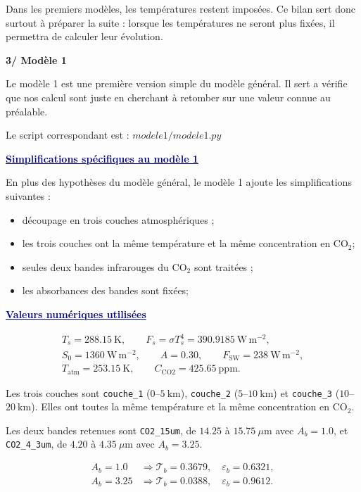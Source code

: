 \documentclass[11pt,a4paper]{article}
\newcommand{\code}[1]{\texttt{#1}}
\newcommand{\COtwo}{CO$_2$}
\newcommand{\fluxunit}{\mathrm{W\,m^{-2}}}
\newcommand{\bloc}[1]{\vspace{0.9em}\noindent\textcolor{DarkBlue}{\underline{\textbf{#1}}}\par\vspace{0.35em}}
\newcommand{\partietitre}[1]{%
    \vspace{1.1em}
    {\Large\bfseries\textcolor{DocRed}{#1}}\par
    \vspace{0.35em}
}
\begin{document}
Dans les premiers modèles, les températures restent imposées. Ce bilan sert donc surtout à préparer la suite : lorsque les températures ne seront plus fixées, il permettra de calculer leur évolution.

\partietitre{3/ Modèle 1}

Le modèle 1 est une première version simple du modèle général. Il sert a vérifie que nos calcul sont juste en cherchant à retomber sur une valeur connue au préalable.

Le script correspondant est : $modele1/modele1.py$

\bloc{Simplifications spécifiques au modèle 1}

En plus des hypothèses du modèle général, le modèle 1 ajoute les simplifications suivantes :

\begin{itemize}
    \item découpage en  trois couches atmosphériques ;
    \item les trois couches ont la même température et la même concentration en \COtwo{};
    \item seules deux bandes infrarouges du \COtwo{} sont traitées ;
    \item les absorbances des bandes sont fixées;
\end{itemize}

\bloc{Valeurs numériques utilisées}


\[
\begin{gathered}
T_s = 288.15\ \mathrm{K},
\qquad
F_s = \sigma T_s^4 = 390.9185\ \fluxunit,\\
S_0 = 1360\ \fluxunit,
\qquad
A = 0.30,
\qquad
F_{\mathrm{SW}} = 238\ \fluxunit,\\
T_{\mathrm{atm}} = 253.15\ \mathrm{K},
\qquad
C_{\mathrm{CO2}} = 425.65\ \mathrm{ppm}.
\end{gathered}
\]

Les trois couches sont \code{couche\_1} ($0$--$5\ \mathrm{km}$), \code{couche\_2} ($5$--$10\ \mathrm{km}$) et \code{couche\_3} ($10$--$20\ \mathrm{km}$). Elles ont toutes la même température et la même concentration en \COtwo.

Les deux bandes retenues sont \code{CO2\_15um}, de $14.25$ à $15.75\ \mu\mathrm{m}$ avec $A_b=1.0$, et \code{CO2\_4\_3um}, de $4.20$ à $4.35\ \mu\mathrm{m}$ avec $A_b=3.25$.

\[
\begin{aligned}
A_b=1.0 &\Rightarrow \mathcal{T}_b=0.3679,\quad \varepsilon_b=0.6321,\\
A_b=3.25 &\Rightarrow \mathcal{T}_b=0.0388,\quad \varepsilon_b=0.9612.
\end{aligned}
\]
\end{document}
